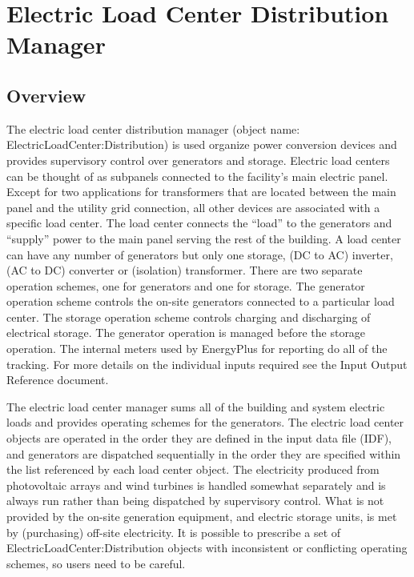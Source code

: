 \section{Electric Load Center Distribution Manager}\label{electric-load-center-distribution-manager}

\subsection{Overview}\label{overview-016}

The electric load center distribution manager (object name: ElectricLoadCenter:Distribution) is used organize power conversion devices and provides supervisory control over generators and storage.   Electric load centers can be thought of as subpanels connected to the facility's main electric panel.  Except for two applications for transformers that are located between the main panel and the utility grid connection, all other devices are associated with a specific load center.  The load center connects the “load” to the generators and “supply” power to the main panel serving the rest of the building.  A load center can have any number of generators but only one storage, (DC to AC) inverter, (AC to DC) converter or (isolation) transformer.  There are two separate operation schemes, one for generators and one for storage.  The generator operation scheme controls the on-site generators connected to a particular load center.  The storage operation scheme controls charging and discharging of electrical storage.  The generator operation is managed before the storage operation.  The internal meters used by EnergyPlus for reporting do all of the tracking. For more details on the individual inputs required see the Input Output Reference document.

The electric load center manager sums all of the building and system electric loads and provides operating schemes for the generators. The electric load center objects are operated in the order they are defined in the input data file (IDF), and generators are dispatched sequentially in the order they are specified within the list referenced by each load center object. The electricity produced from photovoltaic arrays and wind turbines is handled somewhat separately and is always run rather than being dispatched by supervisory control.  What is not provided by the on-site generation equipment, and electric storage units, is met by (purchasing) off-site electricity. It is possible to prescribe a set of ElectricLoadCenter:Distribution objects with inconsistent or conflicting operating schemes, so users need to be careful.

